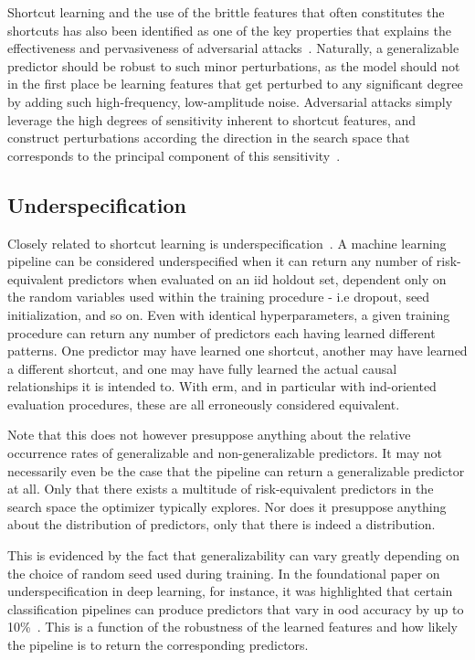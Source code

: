 	Shortcut learning and the use of the brittle features that often constitutes the shortcuts has also been identified as one of the key properties that explains the effectiveness and pervasiveness of adversarial attacks~\cite{adversarial_bugs_features}. Naturally, a generalizable predictor should be robust to such minor perturbations, as the model should not in the first place be learning features that get perturbed to any significant degree by adding such high-frequency, low-amplitude noise. Adversarial attacks simply leverage the high degrees of sensitivity inherent to shortcut features, and construct perturbations according the direction in the search space that corresponds to the principal component of this sensitivity~\cite{sensitivity}. 

	\subsection{Underspecification}
	Closely related to shortcut learning is underspecification~\cite{damour2020underspecification}. A machine learning pipeline can be considered underspecified when it can return any number of risk-equivalent predictors when evaluated on an \gls{iid} holdout set, dependent only on the random variables used within the training procedure - i.e dropout, seed initialization, and so on. Even with identical hyperparameters, a given training procedure can return any number of predictors each having learned different patterns. One predictor may have learned one shortcut, another may have learned a different shortcut, and one may have fully learned the actual causal relationships it is intended to. With \gls{erm}, and in particular with \gls{ind}-oriented evaluation procedures, these are all erroneously considered equivalent. 

	Note that this does not however presuppose anything about the relative occurrence rates of generalizable and non-generalizable predictors. It may not necessarily even be the case that the pipeline can return a generalizable predictor at all. Only that there exists a multitude of risk-equivalent predictors in the search space the optimizer typically explores. Nor does it presuppose anything about the distribution of predictors, only that there is indeed a distribution. 

	This is evidenced by the fact that generalizability can vary greatly depending on the choice of random seed used during training. In the foundational paper on underspecification in deep learning, for instance, it was highlighted that certain classification pipelines can produce predictors that vary in ood accuracy by up to 10\%~\cite{damour2020underspecification}. This is a function of the robustness of the learned features and how likely the pipeline is to return the corresponding predictors. 
	
